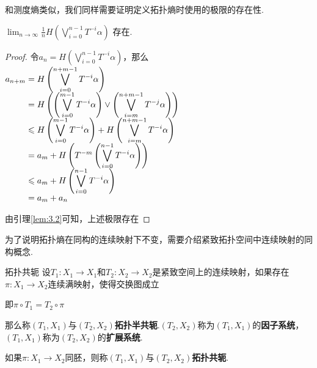 和测度熵类似，我们同样需要证明定义拓扑熵时使用的极限的存在性.\par
\begin{corollary}{}
    $\lim_{n\to\infty}{\frac{1}{n}H\left(\bigvee_{i=0}^{n-1}T^{-i}\alpha\right)}$ 存在.
\end{corollary}
\begin{proof}
    令$a_n=H \left(\bigvee_{i=0}^{n-1}{T^{-i}\alpha}\right)$，那么$\setjot[-2]\begin{aligned}[t]
        a_{n+m} &= H \left(\bigvee_{i=0}^{n+m-1}{T^{-i}\alpha}\right) \\
        &= H \left(\left(\bigvee_{i=0}^{m-1}{T^{-i}\alpha}\right)\vee\left(\bigvee_{i=m}^{n+m-1}{T^{-j}\alpha}\right)\right) \\
        &\leq H \left(\bigvee_{i=0}^{m-1}{T^{-i}\alpha}\right) + H \left(\bigvee_{i=m}^{n+m-1}{T^{-i}\alpha}\right) \\
        &=a_m+H \left(T^{-m}\left(\bigvee_{i=0}^{n-1}T^{-i}\alpha\right)\right) \\
        &\leq a_m+H \left(\bigvee_{i=0}^{n-1}T^{-i}\alpha\right) \\
        &=a_m+a_n
    \end{aligned}$\par
    由引理\ref{lem:3.2}可知，上述极限存在
\end{proof}

为了说明拓扑熵在同构的连续映射下不变，需要介绍紧致拓扑空间中连续映射的同构概念.
\begin{definition}{拓扑共轭}
    设$T_1:X_1\to X_1$和$T_2:X_2\to X_2$是紧致空间上的连续映射，如果存在$\pi:X_1\to X_2$连续满映射，使得交换图成立 \par
\quad 即$\pi\circ T_1=T_2\circ \pi$\par
    那么称$(T_1,X_1)$与$(T_2,X_2)$\textbf{拓扑半共轭}.$(T_2,X_2)$称为$(T_1,X_1)$的\textbf{因子系统}，$(T_1,X_1)$称为$(T_2,X_2)$的\textbf{扩展系统}.\par
    如果$\pi:X_1\to X_2$同胚，则称$(T_1,X_1)$与$(T_2,X_2)$\textbf{拓扑共轭}.
\end{definition}


